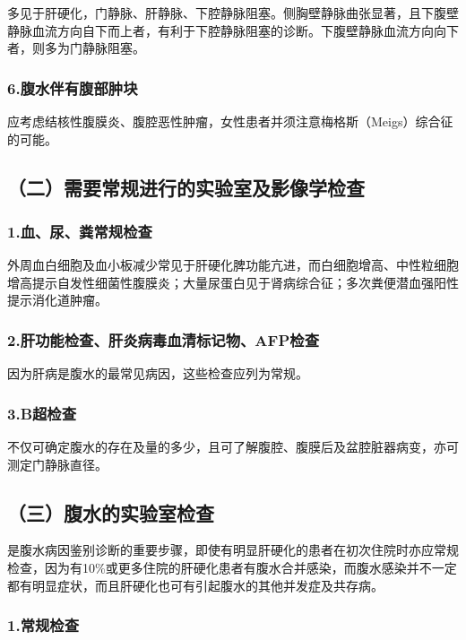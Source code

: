 多见于肝硬化，门静脉、肝静脉、下腔静脉阻塞。侧胸壁静脉曲张显著，且下腹壁静脉血流方向自下而上者，有利于下腔静脉阻塞的诊断。下腹壁静脉血流方向向下者，则多为门静脉阻塞。

\subsubsection{6.腹水伴有腹部肿块}

应考虑结核性腹膜炎、腹腔恶性肿瘤，女性患者并须注意梅格斯（Meigs）综合征的可能。

\subsection{（二）需要常规进行的实验室及影像学检查}

\subsubsection{1.血、尿、粪常规检查}

外周血白细胞及血小板减少常见于肝硬化脾功能亢进，而白细胞增高、中性粒细胞增高提示自发性细菌性腹膜炎；大量尿蛋白见于肾病综合征；多次粪便潜血强阳性提示消化道肿瘤。

\subsubsection{2.肝功能检查、肝炎病毒血清标记物、AFP检查}

因为肝病是腹水的最常见病因，这些检查应列为常规。

\subsubsection{3.B超检查}

不仅可确定腹水的存在及量的多少，且可了解腹腔、腹膜后及盆腔脏器病变，亦可测定门静脉直径。

\subsection{（三）腹水的实验室检查}

是腹水病因鉴别诊断的重要步骤，即使有明显肝硬化的患者在初次住院时亦应常规检查，因为有10\%或更多住院的肝硬化患者有腹水合并感染，而腹水感染并不一定都有明显症状，而且肝硬化也可有引起腹水的其他并发症及共存病。

\subsubsection{1.常规检查}


